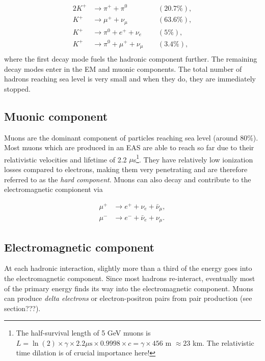\begin{alignat}{2}
K^+ &\rightarrow \pi^+ + \pi^0  &&(20.7\%),\\
K^+ &\rightarrow \mu^+ + \nu_{\mu}  &&(63.6\%),\\
K^+ &\rightarrow \pi^0 + e^+ + \nu_e  &&(5\%),\\
K^+ &\rightarrow \pi^0 + \mu^+ + \nu_{\mu}  \ \ &&(3.4\%),\\
\end{alignat} 
where the first decay mode fuels the hadronic component further. The remaining decay modes enter in the EM and muonic components. The total number of hadrons reaching sea level is very small and when they do, they are immediately stopped.

\subsection{Muonic component}
Muons are the dominant component of particles reaching sea level (around 80\%). Most muons which are produced in an EAS are able to reach so far due to their relativistic velocities and lifetime of 2.2 $\mu$s\footnote{The half-survival length of 5 GeV muons is $L = \ln(2) \times \gamma \times 2.2 \mu\textrm{s} \times 0.9998 \times c = \gamma \times 456$ m $\approx 23$ km. The relativistic time dilation is of crucial importance here!}. They have relatively low ionization losses compared to electrons, making them very penetrating and are therefore referred to as the \textit{hard component}. Muons can also decay and contribute to the electromagnetic compionent via

\begin{equation}
\begin{split}
\mu^+ &\rightarrow e^+ + \nu_e + \bar{\nu}_\mu, \\
\mu^- &\rightarrow e^- + \bar{\nu}_e + \nu_\mu.
\end{split}
\end{equation}

\subsection{Electromagnetic component}
At each hadronic interaction, slightly more than a third of the energy goes into the electromagnetic component. Since most hadrons re-interact, eventually most of the primary energy finds its way into the electromagnetic component. Muons can produce \textit{delta electrons} or electron-positron pairs from pair production (see section???).

